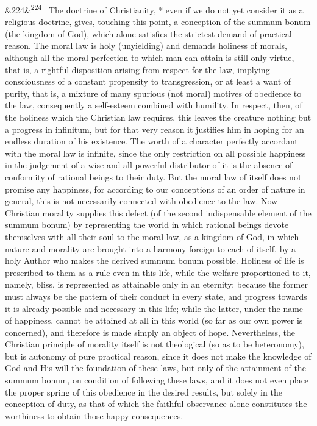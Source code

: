 \documentclass[12pt]{article}
\newcommand{\para}[1][]{\par\noindent\ifx&#1&\else\textsuperscript{\footnotesize #1}~\fi}
\begin{document}
\para[224] The doctrine of Christianity, * even if we do not yet consider it as a religious doctrine, gives, touching this point, a conception of the summum bonum (the kingdom of God), which alone satisfies the strictest demand of practical reason. The moral law is holy (unyielding) and demands holiness of morals, although all the moral perfection to which man can attain is still only virtue, that is, a rightful disposition arising from respect for the law, implying consciousness of a constant propensity to transgression, or at least a want of purity, that is, a mixture of many spurious (not moral) motives of obedience to the law, consequently a self-esteem combined with humility. In respect, then, of the holiness which the Christian law requires, this leaves the creature nothing but a progress in infinitum, but for that very reason it justifies him in hoping for an endless duration of his existence. The worth of a character perfectly accordant with the moral law is infinite, since the only restriction on all possible happiness in the judgement of a wise and all powerful distributor of it is the absence of conformity of rational beings to their duty. But the moral law of itself does not promise any happiness, for according to our conceptions of an order of nature in general, this is not necessarily connected with obedience to the law. Now Christian morality supplies this defect (of the second indispensable element of the summum bonum) by representing the world in which rational beings devote themselves with all their soul to the moral law, as a kingdom of God, in which nature and morality are brought into a harmony foreign to each of itself, by a holy Author who makes the derived summum bonum possible. Holiness of life is prescribed to them as a rule even in this life, while the welfare proportioned to it, namely, bliss, is represented as attainable only in an eternity; because the former must always be the pattern of their conduct in every state, and progress towards it is already possible and necessary in this life; while the latter, under the name of happiness, cannot be attained at all in this world (so far as our own power is concerned), and therefore is made simply an object of hope. Nevertheless, the Christian principle of morality itself is not theological (so as to be heteronomy), but is autonomy of pure practical reason, since it does not make the knowledge of God and His will the foundation of these laws, but only of the attainment of the summum bonum, on condition of following these laws, and it does not even place the proper spring of this obedience in the desired results, but solely in the conception of duty, as that of which the faithful observance alone constitutes the worthiness to obtain those happy consequences.
\end{document}
